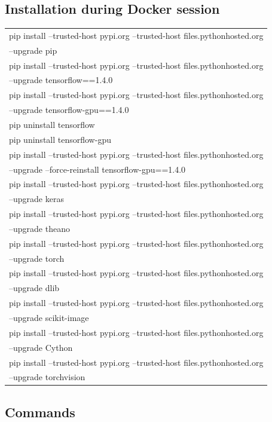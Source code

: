 \documentclass[a4paper]{article}
\begin{document}
\subsection{Installation during Docker session}
\small{\begin{tabular} { >{\ttfamily}l  }
pip install --trusted-host pypi.org --trusted-host files.pythonhosted.org \\ --upgrade pip\\
pip install --trusted-host pypi.org --trusted-host files.pythonhosted.org \\ --upgrade tensorflow==1.4.0\\
pip install --trusted-host pypi.org --trusted-host files.pythonhosted.org \\ --upgrade tensorflow-gpu==1.4.0\\
pip uninstall tensorflow\\
pip uninstall tensorflow-gpu\\
pip install --trusted-host pypi.org --trusted-host files.pythonhosted.org \\ --upgrade --force-reinstall tensorflow-gpu==1.4.0\\
pip install --trusted-host pypi.org --trusted-host files.pythonhosted.org \\ --upgrade keras\\
pip install --trusted-host pypi.org --trusted-host files.pythonhosted.org \\ --upgrade theano\\
pip install --trusted-host pypi.org --trusted-host files.pythonhosted.org \\ --upgrade torch\\
pip install --trusted-host pypi.org --trusted-host files.pythonhosted.org \\ --upgrade dlib\\
pip install --trusted-host pypi.org --trusted-host files.pythonhosted.org \\ --upgrade scikit-image\\
pip install --trusted-host pypi.org --trusted-host files.pythonhosted.org \\ --upgrade Cython\\
pip install --trusted-host pypi.org --trusted-host files.pythonhosted.org \\ --upgrade torchvision\\
\end{tabular}
}


\subsection{Commands}
\end{document}
